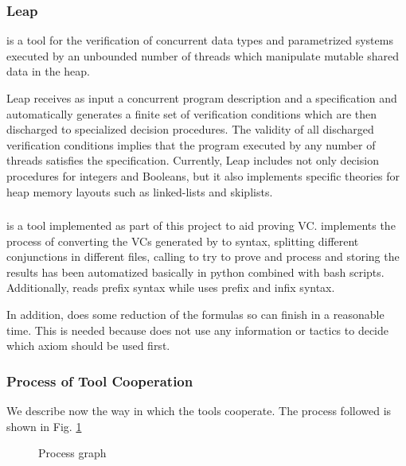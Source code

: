 \subsubsection{Leap}

\leap is a tool for the verification of concurrent data types and parametrized systems executed by an unbounded number of threads which manipulate mutable shared data in the heap.

Leap receives as input a concurrent program description and a specification and automatically generates a finite set of verification conditions which are then discharged to specialized decision procedures. 
%
The validity of all discharged verification conditions implies that the program executed by any number of threads satisfies the specification. 
%
Currently, Leap includes not only decision procedures for integers and Booleans, but it also implements specific theories for heap memory layouts such as linked-lists and skiplists.


\subsubsection{\gandalf}

\gandalf is a tool implemented  as part of this project to aid \spass proving \gls{VC}. 
%
\gandalf implements the process of converting the VCs generated by \leap to \spass syntax, splitting different conjunctions in different files, calling \spass to try to prove and process and storing the results has been automatized basically in python combined with bash scripts.
%
Additionally, \spass reads prefix syntax while \leap uses prefix and infix syntax.

In addition, \gandalf does some reduction of the formulas so \spass can finish in a reasonable time.
%
This is needed because \spass does not use any information or tactics to decide which axiom should be used first.


\subsubsection{Process of Tool Cooperation}

\label{ProcessDescription}
We describe now the way in which the tools cooperate.
%
The process followed is shown in Fig. \ref{fig:process}


\begin{figure}

\caption{Process graph}
\label{fig:process}
\end{figure}

